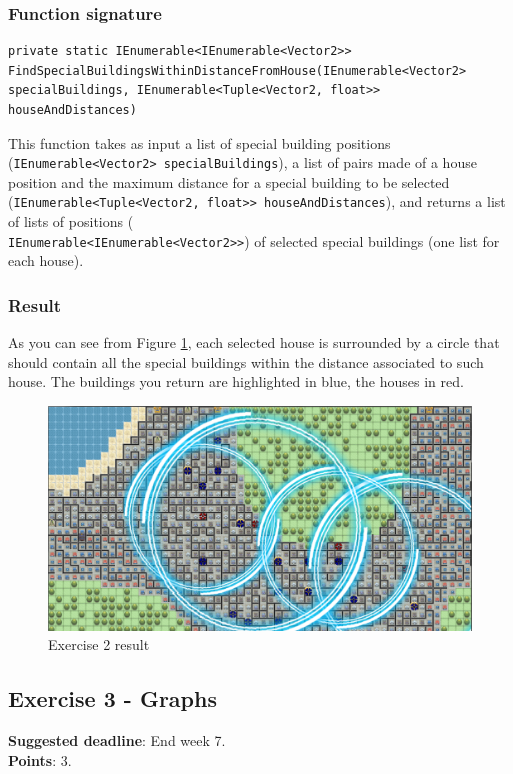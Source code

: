 \subsubsection*{Function signature} 
\begin{lstlisting}
private static IEnumerable<IEnumerable<Vector2>> FindSpecialBuildingsWithinDistanceFromHouse(IEnumerable<Vector2> specialBuildings, IEnumerable<Tuple<Vector2, float>> houseAndDistances)
\end{lstlisting}

\noindent
This function takes as input a list of special building positions (\texttt{IEnumerable<Vector2> specialBuildings}), a list of pairs made of a house position and the maximum distance for a special building to be selected (\texttt{IEnumerable<Tuple<Vector2, float>> houseAndDistances}), and returns a list of lists of positions (\\ \texttt{IEnumerable<IEnumerable<Vector2>>}) of selected special buildings (one list for each house).\\

\subsubsection*{Result}
As you can see from Figure \ref{img:Ex2}, each selected house is surrounded by a circle that should contain all the special buildings within the distance associated to such house. The buildings you return are highlighted in blue, the houses in red.

\begin{figure}[!h]
\centering
\includegraphics[scale=0.25]{img/exercise2}
\caption{Exercise 2 result}
\label{img:Ex2}
\end{figure}

\newpage
\subsection*{Exercise 3 - Graphs}
\textbf{Suggested deadline}: End week 7. \\
\textbf{Points}: 3.

